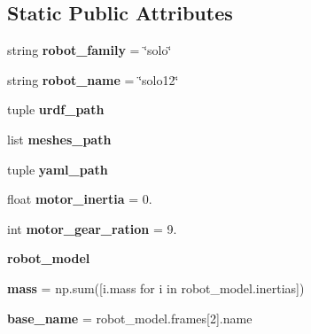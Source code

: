 \subsection*{Static Public Attributes}
\begin{DoxyCompactItemize}
\item 
\mbox{\label{classrobot__properties__solo_1_1config_1_1Solo12Config_a3a6ac10f7f9e5d67ce2390cdfd2b2e2a}} 
string {\bfseries robot\+\_\+family} = \char`\"{}solo\char`\"{}
\item 
\mbox{\label{classrobot__properties__solo_1_1config_1_1Solo12Config_a4c2ad56cfc7c1e30568273bdbed5ac63}} 
string {\bfseries robot\+\_\+name} = \char`\"{}solo12\char`\"{}
\item 
tuple {\bfseries urdf\+\_\+path}
\item 
list {\bfseries meshes\+\_\+path}
\item 
tuple {\bfseries yaml\+\_\+path}
\item 
\mbox{\label{classrobot__properties__solo_1_1config_1_1Solo12Config_abeb949a51a89f8c137492f71c9896c8f}} 
float {\bfseries motor\+\_\+inertia} = 0.
\item 
\mbox{\label{classrobot__properties__solo_1_1config_1_1Solo12Config_a9d6b5c60458887bd15abc40c31794d94}} 
int {\bfseries motor\+\_\+gear\+\_\+ration} = 9.
\item 
{\bfseries robot\+\_\+model}
\item 
\mbox{\label{classrobot__properties__solo_1_1config_1_1Solo12Config_a1cbf9f73f9aea2129ae9c03e85f7aebb}} 
{\bfseries mass} = np.\+sum(\mbox{[}i.\+mass for i in robot\+\_\+model.\+inertias\mbox{]})
\item 
\mbox{\label{classrobot__properties__solo_1_1config_1_1Solo12Config_a08164d8a2fad7463dc5f910d25500c7d}} 
{\bfseries base\+\_\+name} = robot\+\_\+model.\+frames\mbox{[}2\mbox{]}.name
\item 
\mbox{\label{classrobot__properties__solo_1_1config_1_1Solo12Config_ac3ba3f3015a09cd38cc438d9c1d7c0c7}} 

\end{DoxyCompactItemize}
